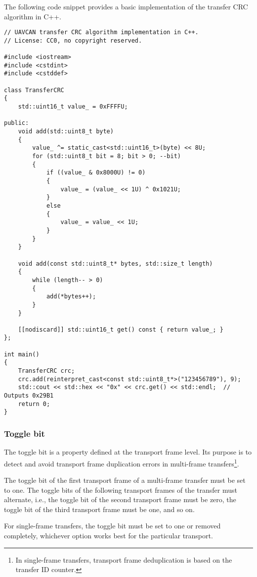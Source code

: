 The following code snippet provides a basic implementation of the transfer CRC algorithm in C++.

\begin{minipage}{0.9\textwidth}
\begin{verbatim}
// UAVCAN transfer CRC algorithm implementation in C++.
// License: CC0, no copyright reserved.

#include <iostream>
#include <cstdint>
#include <cstddef>

class TransferCRC
{
    std::uint16_t value_ = 0xFFFFU;

public:
    void add(std::uint8_t byte)
    {
        value_ ^= static_cast<std::uint16_t>(byte) << 8U;
        for (std::uint8_t bit = 8; bit > 0; --bit)
        {
            if ((value_ & 0x8000U) != 0)
            {
                value_ = (value_ << 1U) ^ 0x1021U;
            }
            else
            {
                value_ = value_ << 1U;
            }
        }
    }

    void add(const std::uint8_t* bytes, std::size_t length)
    {
        while (length-- > 0)
        {
            add(*bytes++);
        }
    }

    [[nodiscard]] std::uint16_t get() const { return value_; }
};

int main()
{
    TransferCRC crc;
    crc.add(reinterpret_cast<const std::uint8_t*>("123456789"), 9);
    std::cout << std::hex << "0x" << crc.get() << std::endl;  // Outputs 0x29B1
    return 0;
}
\end{verbatim}
\end{minipage}

\subsubsection{Toggle bit}\label{sec:toggle_bit}

The toggle bit is a property defined at the transport frame level.
Its purpose is to detect and avoid transport frame duplication errors in multi-frame
transfers\footnote{In single-frame transfers, transport frame deduplication is based on the transfer ID counter.}.

The toggle bit of the first transport frame of a multi-frame transfer must be set to one.
The toggle bits of the following transport frames of the transfer must alternate,
i.e., the toggle bit of the second transport frame must be zero,
the toggle bit of the third transport frame must be one, and so on.

For single-frame transfers, the toggle bit must be set to one or removed completely,
whichever option works best for the particular transport.

